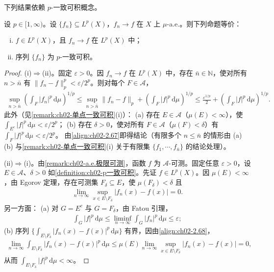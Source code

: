 \documentclass[../../main.tex]{subfiles}%
\begin{document}
下列结果依赖 $p$-一致可积概念。

\begin{theorem}[Vitali]\label{theorem:ch02-Vitali}
设 $p\in[1,\infty)$。设 $\{f_n\}\subseteq L^p(X)$，$f_n\to f$ 在 $X$ 上 $\mu$-a.e.。则下列命题等价：
\begin{enumerate}[(i)]
\item $f\in L^p(X)$，且 $f_n\to f$ 在 $L^p(X)$ 中；
\item 序列 $\{f_n\}$ 为 $p$-一致可积。
\end{enumerate}
\end{theorem}

\begin{proof}
(i)$\Rightarrow$(ii)。固定 $\varepsilon>0$。因 $f_n\to f$ 在 $L^p(X)$ 中，存在 $\bar n\in\mathbb N$，使对所有 $n>\bar n$ 有 $\|f_n-f\|_p^p<\varepsilon/2^p$。则对每个 $F\in\mathscr A$，
\begin{align}
\sup_{n>\bar n}\left(\int_F|f_n|^p\,\mathrm{d}\mu\right)^{1/p}
\leqslant\sup_{n>\bar n}\|f_n-f\|_p+\left(\int_F|f|^p\,\mathrm{d}\mu\right)^{1/p}
\leqslant\frac{\varepsilon^{1/p}}2+\left(\int_F|f|^p\,\mathrm{d}\mu\right)^{1/p}. \label{align:ch02-2.67}
\end{align}
此外（见\cref{remark:ch02-单点一致可积}(i)）：
(a) 存在 $E\in\mathscr A$（$\mu(E)<\infty$），使 $\int_{E^c}|f|^p\,\mathrm{d}\mu<\varepsilon/2^p$；
(b) 存在 $\delta>0$，使对所有 $F\in\mathscr A$（$\mu(F)<\delta$）有 $\int_F|f|^p\,\mathrm{d}\mu<\varepsilon/2^p$。
由\eqref{align:ch02-2.67}即得结论（有限多个 $n\leqslant\bar n$ 的情形由 (a)(b) 与\cref{remark:ch02-单点一致可积}(i) 关于有限集 $\{f_1,\cdots ,f_{\bar n}\}$ 的结论处理）。

(ii)$\Rightarrow$(i)。由\cref{remark:ch02-a.e.极限可测}，函数 $f$ 为 $\mathscr A$-可测。固定任意 $\varepsilon>0$，设 $E\in\mathscr A$、$\delta>0$ 如\cref{definition:ch02-p一致可积}。先证 $f\in L^p(X)$。因 $\mu(E)<\infty$，由 Egorov 定理，存在可测集 $F_\delta\subseteq E$，使 $\mu(F_\delta)<\delta$ 且
\begin{align}
\lim_{n\to\infty}\sup_{x\in E\setminus F_\delta}|f_n(x)-f(x)|=0. \label{align:ch02-2.68}
\end{align}
另一方面：
(a) 对 $G=E^c$ 与 $G=F_\delta$，由 Fatou 引理，
\begin{align*}
\int_G|f|^p\,\mathrm{d}\mu\leqslant\liminf_{n\to\infty}\int_G|f_n|^p\,\mathrm{d}\mu\leqslant\varepsilon;
\end{align*}
(b) 序列 $\{\int_{E\setminus F_\delta}|f_n(x)-f(x)|^p\,\mathrm{d}\mu\}$ 有界，因由\eqref{align:ch02-2.68}，
\begin{align*}
\lim_{n\to\infty}\int_{E\setminus F_\delta}|f_n(x)-f(x)|^p\,\mathrm{d}\mu
\leqslant\mu(E)\lim_{n\to\infty}\sup_{x\in E\setminus F_\delta}|f_n(x)-f(x)|=0,
\end{align*}
从而 $\int_{E\setminus F_\delta}|f|^p\,\mathrm{d}\mu<\infty$。


\end{proof}
\end{document}

